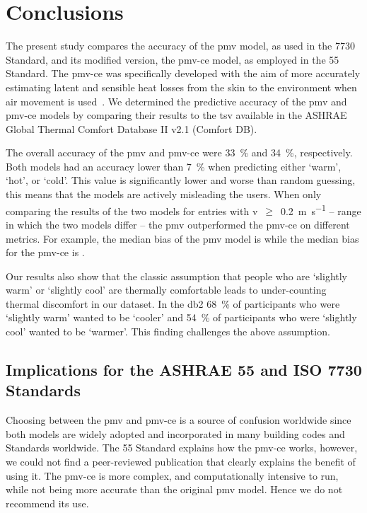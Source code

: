 \section{Conclusions}\label{sec:conclusions}
The present study compares the accuracy of the \ac{pmv} model, as used in the \gls{7730} Standard, and its modified version, the \ac{pmv-ce} model, as employed in the \gls{55} Standard.
The \ac{pmv-ce} was specifically developed with the aim of more accurately estimating latent and sensible heat losses from the skin to the environment when air movement is used~\cite{arens_moving_2009}.
We determined the predictive accuracy of the \ac{pmv} and \ac{pmv-ce} models by comparing their results to the \ac{tsv} available in the ASHRAE Global Thermal Comfort Database II v2.1 (Comfort DB).

The overall accuracy of the \ac{pmv} and \ac{pmv-ce} were \qty{33}{\percent} and \qty{34}{\percent}, respectively.
Both models had an accuracy lower than \qty{7}{\percent} when predicting either `warm', `hot', or `cold'.
This value is significantly lower and worse than random guessing, this means that the models are actively misleading the users.
When only comparing the results of the two models for entries with \ac{v}~$\geq$~\qty{0.2}{\m\per\s} -- range in which the two models differ -- the \ac{pmv} outperformed the \ac{pmv-ce} on different metrics.
For example, the median bias of the \ac{pmv} model is  while the median bias for the \ac{pmv-ce} is .

Our results also show that the classic assumption that people who are `slightly warm' or `slightly cool' are thermally comfortable leads to under-counting thermal discomfort in our dataset.
In the \ac{db2} \qty{68}{\percent} of participants who were `slightly warm' wanted to be `cooler' and \qty{54}{\percent} of participants who were `slightly cool' wanted to be `warmer'.
This finding challenges the above assumption.

\subsection{Implications for the ASHRAE 55 and ISO 7730 Standards}\label{subsec:implications-for-the-ashrae-55-and-iso-7730-standards}
Choosing between the \ac{pmv} and \ac{pmv-ce} is a source of confusion worldwide since both models are widely adopted and incorporated in many building codes and Standards worldwide.
The \gls{55} Standard explains how the \ac{pmv-ce} works, however, we could not find a peer-reviewed publication that clearly explains the benefit of using it.
The \ac{pmv-ce} is more complex, and computationally intensive to run, while not being more accurate than the original \ac{pmv} model.
Hence we do not recommend its use.

